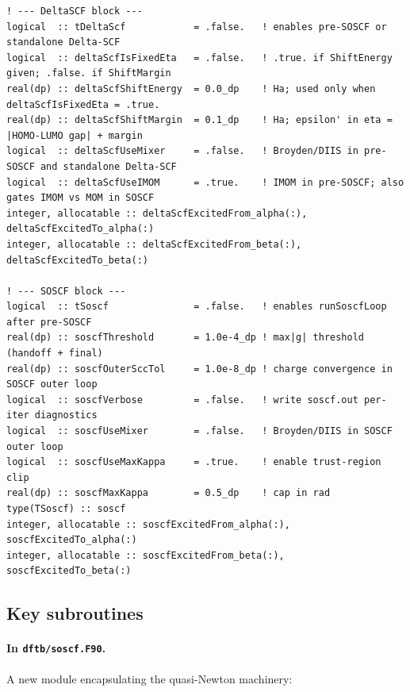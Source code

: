 \documentclass[11pt,a4paper]{article}
\begin{document}
\begin{lstlisting}[style=fortran,caption={SOSCF / Delta-SCF fields on the DFTB+ run-state struct (\texttt{initprogram.F90}).}]
! --- DeltaSCF block ---
logical  :: tDeltaScf            = .false.   ! enables pre-SOSCF or standalone Delta-SCF
logical  :: deltaScfIsFixedEta   = .false.   ! .true. if ShiftEnergy given; .false. if ShiftMargin
real(dp) :: deltaScfShiftEnergy  = 0.0_dp    ! Ha; used only when deltaScfIsFixedEta = .true.
real(dp) :: deltaScfShiftMargin  = 0.1_dp    ! Ha; epsilon' in eta = |HOMO-LUMO gap| + margin
logical  :: deltaScfUseMixer     = .false.   ! Broyden/DIIS in pre-SOSCF and standalone Delta-SCF
logical  :: deltaScfUseIMOM      = .true.    ! IMOM in pre-SOSCF; also gates IMOM vs MOM in SOSCF
integer, allocatable :: deltaScfExcitedFrom_alpha(:), deltaScfExcitedTo_alpha(:)
integer, allocatable :: deltaScfExcitedFrom_beta(:),  deltaScfExcitedTo_beta(:)

! --- SOSCF block ---
logical  :: tSoscf               = .false.   ! enables runSoscfLoop after pre-SOSCF
real(dp) :: soscfThreshold       = 1.0e-4_dp ! max|g| threshold (handoff + final)
real(dp) :: soscfOuterSccTol     = 1.0e-8_dp ! charge convergence in SOSCF outer loop
logical  :: soscfVerbose         = .false.   ! write soscf.out per-iter diagnostics
logical  :: soscfUseMixer        = .false.   ! Broyden/DIIS in SOSCF outer loop
logical  :: soscfUseMaxKappa     = .true.    ! enable trust-region clip
real(dp) :: soscfMaxKappa        = 0.5_dp    ! cap in rad
type(TSoscf) :: soscf
integer, allocatable :: soscfExcitedFrom_alpha(:), soscfExcitedTo_alpha(:)
integer, allocatable :: soscfExcitedFrom_beta(:),  soscfExcitedTo_beta(:)
\end{lstlisting}

\subsection{Key subroutines}

\paragraph{In \texttt{dftb/soscf.F90}.}
A new module encapsulating the quasi-Newton machinery:
\end{document}
